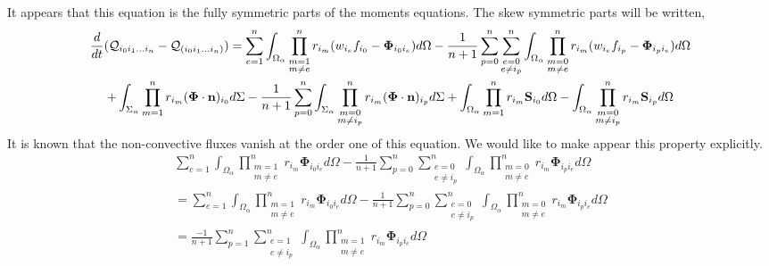 It appears that this equation is the fully symmetric parts of the moments equations. 
The skew symmetric parts will be written, 
\begin{multline}
    \frac{d}{dt} (
    \mathcal{Q}_{i_0 i_1\ldots i_n} 
    - \mathcal{Q}_{(i_0 i_1\ldots i_n) }
    )
    = 
    \sum_{e=1}^{n} \int_{\Omega_\alpha} \prod^{n}_{\substack{ m=1 \\   m \neq e}} r_{i_m} (w_{i_e}f_{i_0}  - \mathbf{\Phi}_{i_0 i_e})d\Omega
    -
    \frac{1}{n+1}
    \sum_{p=0}^{n}
    \sum_{\substack{ e=0 \\   e \neq i_p}}^{n} \int_{\Omega_\alpha} 
    \prod^{n}_{\substack{ m=0 \\   m \neq e}} r_{i_m} (w_{i_e}f_{i_p}  - \mathbf{\Phi}_{i_p i_e})d\Omega\\
    +\int_{\Sigma_\alpha} \prod_{m=1}^{n} r_{i_m} (\mathbf{\Phi} \cdot \textbf{n})_{i_0}d\Sigma
    -
    \frac{1}{n+1}
    \sum_{p=0}^{n}
    \int_{\Sigma_\alpha} \prod^{n}_{\substack{ m=0 \\   m \neq i_p}} r_{i_m}
    (\mathbf{\Phi} \cdot \textbf{n})_{i_p}d\Sigma
    + \int_{\Omega_\alpha} \prod_{m=1}^{n} r_{i_m} \textbf{S}_{i_0} d\Omega
    -
    \int_{\Omega_\alpha} 
    \prod^{n}_{\substack{ m=0 \\   m \neq i_p}} r_{i_m}
    \textbf{S}_{i_p} d\Omega
\end{multline}
It is known that the non-convective fluxes vanish at the order one of this equation. 
We would like to make appear this property explicitly. 
\begin{multline*}
    \sum_{e=1}^{n} \int_{\Omega_\alpha} \prod^{n}_{\substack{ m=1 \\   m \neq e}} r_{i_m} \mathbf{\Phi}_{i_0 i_e} d\Omega
    -
    \frac{1}{n+1}
    \sum_{p=0}^{n}
    \sum_{\substack{ e=0 \\   e \neq i_p}}^{n} \int_{\Omega_\alpha} 
    \prod^{n}_{\substack{ m=0 \\   m \neq e}} r_{i_m}  \mathbf{\Phi}_{i_p i_e}d\Omega\\
    =
    \sum_{e=1}^{n} \int_{\Omega_\alpha} \prod^{n}_{\substack{ m=1 \\   m \neq e}} r_{i_m} \mathbf{\Phi}_{i_0 i_e}d\Omega
    -
    \frac{1}{n+1}
    \sum_{p=0}^{n}
    \sum_{\substack{ e=0 \\   e \neq i_p}}^{n} \int_{\Omega_\alpha} 
    \prod^{n}_{\substack{ m=0 \\   m \neq e}} r_{i_m}  \mathbf{\Phi}_{i_p i_e}d\Omega\\
    =
    \frac{- 1}{n+1}
    \sum_{p=1}^{n}
    \sum_{\substack{ e=1 \\   e \neq i_p}}^{n} \int_{\Omega_\alpha} 
    \prod^{n}_{\substack{ m=1 \\   m \neq e}} r_{i_m}  \mathbf{\Phi}_{i_p i_e}d\Omega
\end{multline*}

